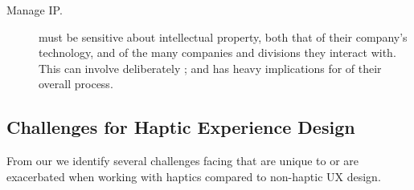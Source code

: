 \begin{description}
    \item[Manage IP.]
     must be sensitive about intellectual property, both that of their company's technology, and of the many companies and divisions they interact with. This can involve deliberately ; and has heavy implications for  of their overall process.

\end{description}




\subsection{Challenges for Haptic Experience Design}
\noindent
%
From our  %
we identify several challenges facing  that are unique to \haxd or are exacerbated when working with haptics compared to non-haptic UX design. 





